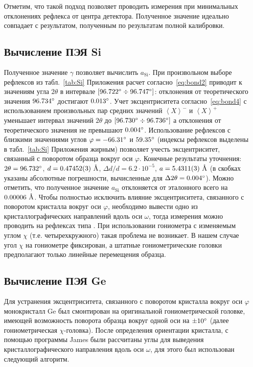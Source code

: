 Отметим, что такой подход позволяет проводить измерения при минимальных отклонениях рефлекса от центра детектора.
Полученное значение идеально совпадает с результатом, полученным по результатам полной калибровки.

\subsection{Вычисление ПЭЯ Si}

Полученное значение $\gamma$ позволяет вычислить $a_\text{Si}$.
При произвольном выборе рефлексов из табл.~\ref{tab:Si} Приложения расчет согласно~\ref{eq:bond2} приводит к значениям угла $2\theta$ в интервале $[96.722^\circ\div96.747^\circ]$: отклонения от теоретического значения $96.734^\circ$ достигают $0.013^\circ$.
Учет эксцентриситета согласно~\ref{eq:bond4} с использованием произвольных пар средних значений $\left<X\right>^-$ и $\left<X\right>^+$ уменьшает интервал значений $2\theta$ до $[96.730^\circ\div96.736^\circ]$ а отклонения от теоретического значения не превышают $0.004^\circ$.
Использование рефлексов с близкими значениями углов $\varphi = -66.31^\circ$ и $59.35^\circ$ (индексы рефлексов выделены в табл.~\ref{tab:Si} Приложения жирным) позволяет учесть эксцентриситет, связанный с поворотом образца вокруг оси $\varphi$.
Конечные результаты уточнения: $2\theta = 96.732^\circ$, $d = 0.47452 (3)\ \text{\AA}$, $\Delta d / d = 6.2 \cdot 10^{-5}$, $a = 5.4311(3)\ \text{\AA}$ (в скобках указаны абсолютные погрешности, вычисленные для $\Delta 2 \theta = 0.004^\circ$).
Можно отметить, что полученное значение $a_\text{Si}$ отклоняется от эталонного всего на $0.00006\ \text{\AA}$.
Чтобы полностью исключить влияние эксцентриситета, связанного с поворотом кристалла вокруг оси $\varphi$, необходимо вывести одно из кристаллографических направлений вдоль оси $\omega$, тогда измерения можно проводить на рефлексах типа .
При использовании гониометра с изменяемым углом $\chi$ (т.е. четырехкружного) такая проблема не возникает.
В нашем случае угол $\chi$ на гониометре фиксирован, а штатные гониометрические головки предполагают только линейные перемещения образца.

\subsection{Вычисление ПЭЯ Ge}

Для устранения эксцентриситета, связанного с поворотом кристалла вокруг оси $\varphi$ монокристалл Ge был смонтирован на оригинальной гониометрической головке, имеющей возможность поворота образца вокруг одной оси на $\pm 10^\circ$ (далее гониометрическая $\chi$-головка).
После определения ориентации кристалла, с помощью программы James были рассчитаны углы для выведения кристаллографического направления вдоль оси $\omega$, для этого был использован следующий алгоритм.

